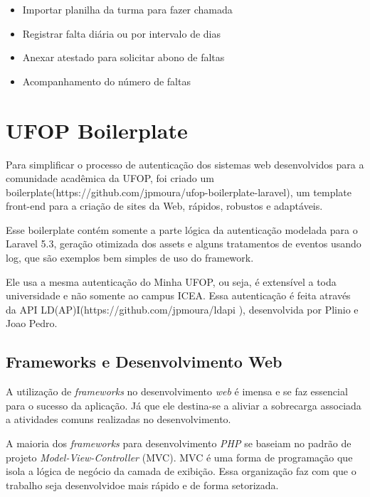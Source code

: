 \documentclass[
  12pt,       %
  openright,      %
  oneside,      %
  a4paper,      %
  english,      %
  french,        %
  spanish,     %
  brazil        %
  ]{abntex2-decsi}
\begin{document}
            \begin{itemize}
            	\item Importar planilha da turma para fazer chamada 
                \item Registrar falta diária ou por intervalo de dias
                \item Anexar atestado para solicitar abono de faltas
                \item Acompanhamento do número de faltas 
            \end{itemize}
                
        

    \section{UFOP Boilerplate}
    
    Para simplificar o processo de autenticação dos sistemas web desenvolvidos para a comunidade acadêmica da UFOP, foi criado um boilerplate(https://github.com/jpmoura/ufop-boilerplate-laravel), um template front-end para a criação de sites da Web, rápidos, robustos e adaptáveis.
    
    Esse boilerplate contém somente a parte lógica da autenticação modelada para o Laravel 5.3, geração otimizada dos assets e alguns tratamentos de eventos usando log, que são exemplos bem simples de uso do framework.

	Ele usa a mesma autenticação do Minha UFOP, ou seja, é extensível a toda universidade e não somente ao campus ICEA. Essa autenticação é feita através da API LD(AP)I(https://github.com/jpmoura/ldapi ), desenvolvida por Plinio e Joao Pedro.    

        \subsection{Frameworks e Desenvolvimento Web}
        
            A utilização de \textit{frameworks} no desenvolvimento \textit{web} é imensa e se faz essencial para o sucesso da aplicação. Já que ele destina-se a aliviar a sobrecarga associada a atividades comuns realizadas no desenvolvimento. 
            
            A maioria dos \textit{frameworks} para desenvolvimento \textit{PHP} se baseiam no padrão de projeto \textit{Model-View-Controller} (MVC). MVC é uma forma de programação que isola a lógica de negócio da camada de exibição. Essa organização faz com que o trabalho seja desenvolvidoe mais rápido e de forma setorizada. 
            
\end{document}
